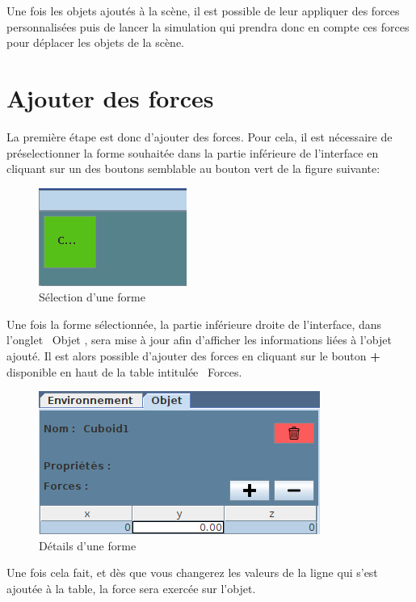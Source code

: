 \documentclass[11pt]{report}
\begin{document}
Une fois les objets ajoutés à la scène, il est possible de leur appliquer des forces personnalisées puis de lancer la simulation qui prendra
donc en compte ces forces pour déplacer les objets de la scène.

\section{Ajouter des forces}

La première étape est donc d'ajouter des forces. Pour cela, il est nécessaire de préselectionner la forme souhaitée dans la partie inférieure
de l'interface en cliquant sur un des boutons semblable au bouton vert de la figure suivante:

\begin{figure}[h]
  \centering
  \includegraphics{./bouton_forme.png}
  \caption{Sélection d'une forme}
\end{figure}

Une fois la forme sélectionnée, la partie inférieure droite de l'interface, dans l'onglet \flqq\ Objet \frqq, sera mise à jour afin d'afficher
les informations liées à l'objet ajouté. Il est alors possible d'ajouter des forces en cliquant sur le bouton \textbf{+} disponible en haut
de la table intitulée \flqq\ Forces\frqq.

\begin{figure}[h]
  \centering
  \includegraphics{./proprieteForme.png}
  \caption{Détails d'une forme}
\end{figure}

Une fois cela fait, et dès que vous changerez les valeurs de la ligne qui s'est ajoutée à la table, la force sera exercée sur l'objet.
\end{document}
